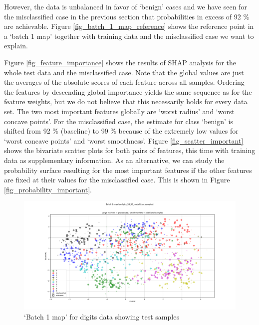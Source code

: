 However, the data is unbalanced in favor of `benign' cases and we have seen for the misclassified case in the previous section that probabilities in excess of 92 \% are achievable.
Figure \ref{fig_batch_1_map_reference} shows the reference point in a `batch 1 map' together with training data and the misclassified case we want to explain.\par
%
Figure \ref{fig_feature_importance} shows the results of SHAP analysis for the whole test data and the misclassified case.
Note that the global values are just the averages of the absolute scores of each feature across all samples.
Ordering the features by descending global importance yields the same sequence as for the feature weights, but we do not believe that this necessarily holds for every data set.
The two most important features globally are `worst radius' and `worst concave points'.
For the misclassified case, the estimate for class `benign' is shifted from 92 \% (baseline) to 99 \% because of the extremely low values for `worst concave points' and `worst smoothness'.
Figure \ref{fig_scatter_important} shows the bivariate scatter plots for both pairs of features, this time with training data as supplementary information.
As an alternative, we can study the probability surface resulting for the most important features if the other features are fixed at their values for the misclassified case.
This is shown in Figure \ref{fig_probability_important}.\par
%
\clearpage
%
\begin{figure}
\caption{`Batch 1 map' for digits data showing test samples}
\label{fig_batch_1_map_test_digits}
%
\begin{center}
\includegraphics[width=0.95\textheight, angle=90]{figures/digits_batch_1_map.pdf}
\end{center}
\end{figure}
%
